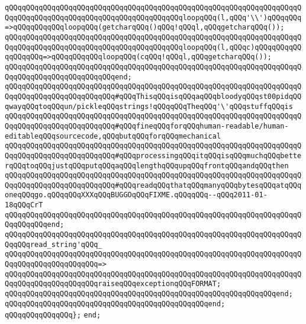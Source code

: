 \verb|qQQqqQQqqQQqqQQqqQQqqQQqqQQqqQQqqQQqqQQqqQQqqQQqqQQqqQQqqQQqqQQqqQQqqQQqqQQqqQQqqQQqqQQqqQQqqQQqqQQqqQQqqQQqqQQqloopqQQq(l,qQQq'\\')qQQqqQQq=>qQQqqQQqqQQqloopqQQq(getcharqQQq()qQQq!qQQql,qQQqgetcharqQQq());|\newline
\verb|qQQqqQQqqQQqqQQqqQQqqQQqqQQqqQQqqQQqqQQqqQQqqQQqqQQqqQQqqQQqqQQqqQQqqQQqqQQqqQQqqQQqqQQqqQQqqQQqqQQqqQQqqQQqqQQqloopqQQq(l,qQQqc)qQQqqQQqqQQqqQQqqQQq=>qQQqqQQqqQQqloopqQQq(cqQQq!qQQql,qQQqgetcharqQQq());|\newline
\verb|qQQqqQQqqQQqqQQqqQQqqQQqqQQqqQQqqQQqqQQqqQQqqQQqqQQqqQQqqQQqqQQqqQQqqQQqqQQqqQQqqQQqqQQqqQQqqQQqend;|\newline
\verb|qQQqqQQqqQQqqQQqqQQqqQQqqQQqqQQqqQQqqQQqqQQqqQQqqQQqqQQqqQQqqQQqqQQqqQQqqQQqqQQqqQQqqQQqqQQqqQQq#qQQqThisqQQqisqQQqaqQQqbloodyqQQqst00pidqQQqwayqQQqtoqQQqun/pickleqQQqstrings!qQQqqQQqTheqQQq'\'qQQqstuffqQQqis|\newline
\verb|qQQqqQQqqQQqqQQqqQQqqQQqqQQqqQQqqQQqqQQqqQQqqQQqqQQqqQQqqQQqqQQqqQQqqQQqqQQqqQQqqQQqqQQqqQQqqQQq#qQQqfineqQQqforqQQqhuman-readable/human-editableqQQqsourcecode,qQQqbutqQQqforqQQqmechanical|\newline
\verb|qQQqqQQqqQQqqQQqqQQqqQQqqQQqqQQqqQQqqQQqqQQqqQQqqQQqqQQqqQQqqQQqqQQqqQQqqQQqqQQqqQQqqQQqqQQqqQQq#qQQqprocessingqQQqitqQQqisqQQqmuchqQQqbetterqQQqtoqQQqjustqQQqputqQQqaqQQqlengthqQQqupqQQqfrontqQQqandqQQqthen|\newline
\verb|qQQqqQQqqQQqqQQqqQQqqQQqqQQqqQQqqQQqqQQqqQQqqQQqqQQqqQQqqQQqqQQqqQQqqQQqqQQqqQQqqQQqqQQqqQQqqQQq#qQQqreadqQQqthatqQQqmanyqQQqbytesqQQqatqQQqoneqQQqgo.qQQqqQQqXXXqQQqBUGGOqQQqFIXME.qQQqqQQq--qQQq2011-01-18qQQqCrT|\newline
\verb|qQQqqQQqqQQqqQQqqQQqqQQqqQQqqQQqqQQqqQQqqQQqqQQqqQQqqQQqqQQqqQQqqQQqqQQqqQQqqQQqend;|\newline
\newline
\verb|qQQqqQQqqQQqqQQqqQQqqQQqqQQqqQQqqQQqqQQqqQQqqQQqqQQqqQQqqQQqqQQqqQQqqQQqqQQqread_string'qQQq_|\newline
\verb|qQQqqQQqqQQqqQQqqQQqqQQqqQQqqQQqqQQqqQQqqQQqqQQqqQQqqQQqqQQqqQQqqQQqqQQqqQQqqQQqqQQqqQQqqQQq=>|\newline
\verb|qQQqqQQqqQQqqQQqqQQqqQQqqQQqqQQqqQQqqQQqqQQqqQQqqQQqqQQqqQQqqQQqqQQqqQQqqQQqqQQqqQQqqQQqqQQqraiseqQQqexceptionqQQqFORMAT;|\newline
\verb|qQQqqQQqqQQqqQQqqQQqqQQqqQQqqQQqqQQqqQQqqQQqqQQqqQQqqQQqqQQqqQQqend;|\newline
\verb|qQQqqQQqqQQqqQQqqQQqqQQqqQQqqQQqqQQqqQQqqQQqqQQqend;|\newline
\verb|qQQqqQQqqQQqqQQq};|\newline
\verb|end;|\newline
\newline

